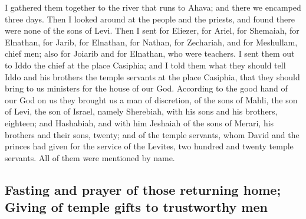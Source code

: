 I gathered them together to the river that runs to
Ahava; and there we encamped three days. Then I looked around at the
people and the priests, and found there were none of the sons of Levi.
 Then I sent for Eliezer, for Ariel, for Shemaiah, for
Elnathan, for Jarib, for Elnathan, for Nathan, for Zechariah, and for
Meshullam, chief men; also for Joiarib and for Elnathan, who were
teachers.  I sent them out to Iddo the chief at the place
Casiphia; and I told them what they should tell Iddo and his brothers
the temple servants at the place Casiphia, that they should bring to us
ministers for the house of our God.  According to the
good hand of our God on us they brought us a man of discretion, of the
sons of Mahli, the son of Levi, the son of Israel, namely Sherebiah,
with his sons and his brothers, eighteen;  and Hashabiah,
and with him Jeshaiah of the sons of Merari, his brothers and their
sons, twenty;  and of the temple servants, whom David and
the princes had given for the service of the Levites, two hundred and
twenty temple servants. All of them were mentioned by name.

\hypertarget{fasting-and-prayer-of-those-returning-home-giving-of-temple-gifts-to-trustworthy-men}{%
\subsection{Fasting and prayer of those returning home; Giving of temple
gifts to trustworthy
men}\label{fasting-and-prayer-of-those-returning-home-giving-of-temple-gifts-to-trustworthy-men}}

